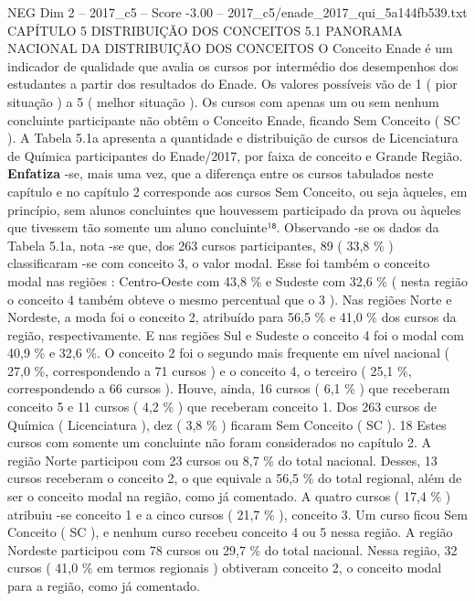 \begin{textsample}{NEG Dim 2 – 2017\_c5 – Score -3.00 – 2017\_c5/enade\_2017\_qui\_5a144fb539.txt}  \label{ex:f2_neg_050}
CAPÍTULO 5 DISTRIBUIÇÃO DOS CONCEITOS 5.1 PANORAMA NACIONAL DA DISTRIBUIÇÃO DOS CONCEITOS O Conceito Enade é um indicador de qualidade que avalia os cursos por intermédio dos desempenhos dos estudantes a partir dos resultados do Enade.
Os valores possíveis vão de 1 ( pior situação ) a 5 ( melhor situação ).
Os cursos com apenas um ou sem nenhum concluinte participante não obtêm o Conceito Enade, ficando Sem Conceito ( SC ).
A Tabela 5.1a apresenta a quantidade e distribuição de cursos de Licenciatura de Química participantes do Enade/2017, por faixa de conceito e Grande Região. \textbf{Enfatiza} -se, mais uma vez, que a diferença entre os cursos tabulados neste capítulo e no capítulo 2 corresponde aos cursos Sem Conceito, ou seja àqueles, em princípio, sem alunos concluintes que houvessem participado da prova ou àqueles que tivessem tão somente um aluno concluinte¹⁸.
Observando -se os dados da Tabela 5.1a, nota -se que, dos 263 cursos participantes, 89 ( 33,8 \% ) classificaram -se com conceito 3, o valor modal.
Esse foi também o conceito modal nas regiões : Centro-Oeste com 43,8 \% e Sudeste com 32,6 \% ( nesta região o conceito 4 também obteve o mesmo percentual que o 3 ).
Nas regiões Norte e Nordeste, a moda foi o conceito 2, atribuído para 56,5 \% e 41,0 \% dos cursos da região, respectivamente.
E nas regiões Sul e Sudeste o conceito 4 foi o modal com 40,9 \% e 32,6 \%.
O conceito 2 foi o segundo mais frequente em nível nacional ( 27,0 \%, correspondendo a 71 cursos ) e o conceito 4, o terceiro ( 25,1 \%, correspondendo a 66 cursos ).
Houve, ainda, 16 cursos ( 6,1 \% ) que receberam conceito 5 e 11 cursos ( 4,2 \% ) que receberam conceito 1.
Dos 263 cursos de Química ( Licenciatura ), dez ( 3,8 \% ) ficaram Sem Conceito ( SC ). 18 Estes cursos com somente um concluinte não foram considerados no capítulo 2.
A região Norte participou com 23 cursos ou 8,7 \% do total nacional.
Desses, 13 cursos receberam o conceito 2, o que equivale a 56,5 \% do total regional, além de ser o conceito modal na região, como já comentado.
A quatro cursos ( 17,4 \% ) atribuiu -se conceito 1 e a cinco cursos ( 21,7 \% ), conceito 3.
Um curso ficou Sem Conceito ( SC ), e nenhum curso recebeu conceito 4 ou 5 nessa região.
A região Nordeste participou com 78 cursos ou 29,7 \% do total nacional.
Nessa região, 32 cursos ( 41,0 \% em termos regionais ) obtiveram conceito 2, o conceito modal para a região, como já comentado.

\end{textsample}
